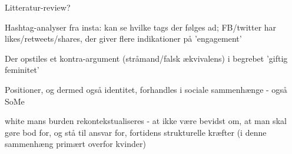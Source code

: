 Litteratur-review?

Hashtag-analyser fra insta: kan se hvilke tags der følges ad; FB/twitter har
likes/retweets/shares, der giver flere indikationer på 'engagement'

Der opstiles et kontra-argument (stråmand/falsk ækvivalens) i begrebet 'giftig
feminitet'

Positioner, og dermed også identitet, forhandles i sociale sammenhænge - også
SoMe


white mans burden rekontekstualiseres - at ikke være bevidst om, at man skal
gøre bod for, og stå til ansvar for, fortidens strukturelle kræfter (i denne
sammenhæng primært overfor kvinder)
